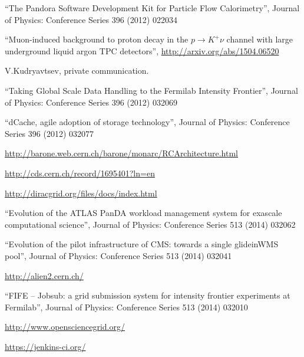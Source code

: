 \begin{thebibliography}{99}
 ``The Pandora Software Development Kit for Particle Flow Calorimetry'', Journal of Physics: Conference Series 396 (2012) 022034

 ``Muon-induced background to proton decay in the $p \rightarrow K^+\nu$ channel with large underground liquid argon TPC detectors'', \url{http://arxiv.org/abs/1504.06520}

 V.Kudryavtsev, private communication.

 ``Taking Global Scale Data Handling to the Fermilab Intensity Frontier'', Journal of Physics: Conference Series 396 (2012) 032069

 ``dCache, agile adoption of storage technology'', Journal of Physics: Conference Series 396 (2012) 032077

 \url{http://barone.web.cern.ch/barone/monarc/RCArchitecture.html}

 \url{http://cds.cern.ch/record/1695401?ln=en}

 \url{http://diracgrid.org/files/docs/index.html}

 ``Evolution of the ATLAS PanDA workload management system for exascale computational science'', Journal of Physics: Conference Series 513 (2014) 032062

 ``Evolution of the pilot infrastructure of CMS: towards a single glideinWMS pool'',  Journal of Physics: Conference Series 513 (2014) 032041

 \url{http://alien2.cern.ch/}

 ``FIFE -- Jobsub: a grid submission system for intensity frontier experiments at Fermilab'',  Journal of Physics: Conference Series 513 (2014) 032010

 \url{http://www.opensciencegrid.org/}

 \url{https://jenkins-ci.org/}

\end{thebibliography}